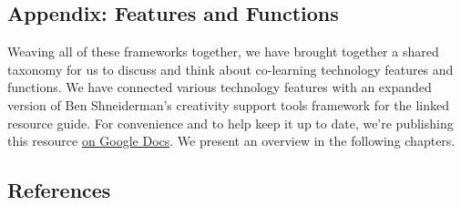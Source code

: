 \hypertarget{appendix-features-and-functions}{%
\subsection{Appendix: Features and
Functions}\label{appendix-features-and-functions}}

Weaving all of these frameworks together, we have brought together a
shared taxonomy for us to discuss and think about co-learning technology
features and functions. We have connected various technology features
with an expanded version of Ben Shneiderman's creativity support tools
framework for the linked resource guide. For convenience and to help
keep it up to date, we're publishing this resource
\href{http://goo.gl/H02fMA}{on Google Docs}. We present an overview in
the following chapters.

\hypertarget{references}{%
\subsection{References}\label{references}}

